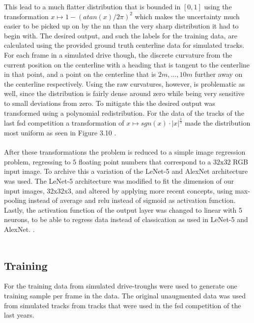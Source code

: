 This lead to a much flatter distribution that is bounded in $[0,1]$ using the transformation $x \mapsto 1-(atan(x)/2\pi)^2$ which makes the uncertainty much easier to be picked up on by the \ac{nn}\cite{Sola1997} than the very sharp distribution it had to begin with. 
The desired output, and such the labels for the training data, are calculated using the provided ground truth centerline data for simulated tracks. For each frame in a simulated drive though, the discrete curvature from the current position on the centerline with a heading that is tangent to the centerline in that point, and a point on the centerline that is $2m, ..., 10m$ further away on the centerline respectively. Using the raw curvatures, however, is problematic as well, since the distribution is fairly dense around zero while being very sensitive to small deviations from zero. To mitigate this the desired output was transformed using a polynomial redistribution. For the data of the tracks of the last \ac{fsd} competition a transformation of $x \mapsto sgn(x)\cdot |x|^\frac{1}{3}$ made the distribution most uniform as seen in Figure 3.10
. \\
\\
After these transformations the problem is reduced to a simple image regression problem, regressing to $5$ floating point numbers that correspond to a $32\text{x}32$ RGB input image. To archive this a variation of the  LeNet-5\cite{Lecun1998} and AlexNet\cite{Alex2012} architecture was used. The LeNet-5 architecture was modified to fit the dimension of our input images, $32\text{x}32\text{x}3$, and altered by applying more recent concepts, using max-pooling instead of average and \ac{relu} instead of sigmoid as activation function. Lastly, the activation function of the output layer was changed to linear with 5 neurons, to be able to regress data instead of classication as used in LeNet-5\cite{Lecun1998} and AlexNet\cite{Alex2012}. 
. \\
\\
\subsection{Training}
For the training data from simulated drive-troughs were used to generate one training sample per frame in the data. The original unaugmented data was used
from simulated tracks from tracks that were used in the \ac{fsd} competition of the last years.